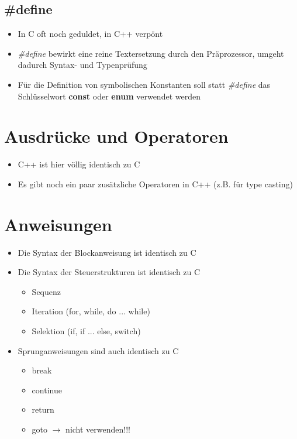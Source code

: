 \subsection{{\#}define}
\begin{itemize}
	\item In C oft noch geduldet, in C++ verpönt
	\item \emph{\#define} bewirkt eine reine Textersetzung durch den Präprozessor, umgeht dadurch Syntax- und Typenprüfung
	\item Für die Definition von symbolischen Konstanten soll statt \emph{\#define} das Schlüsselwort \textbf{const} oder \textbf{enum} verwendet werden\\
\end{itemize}

\section{Ausdrücke und Operatoren}
\begin{itemize}
	\item C++ ist hier völlig identisch zu C
	\item Es gibt noch ein paar zusätzliche Operatoren in C++ (z.B. für type casting)
\end{itemize}

\section{Anweisungen}
\begin{itemize}
	\item Die Syntax der Blockanweisung ist identisch zu C
	\item Die Syntax der Steuerstrukturen ist identisch zu C
	\begin{itemize}
		\item Sequenz
		\item Iteration (for, while, do ... while)
		\item Selektion (if, if ... else, switch)
	\end{itemize}
	\item Sprunganweisungen sind auch identisch zu C
	\begin{itemize}
		\item break
		\item continue
		\item return
		\item goto $\rightarrow$ nicht verwenden!!!
	\end{itemize}
\end{itemize}

